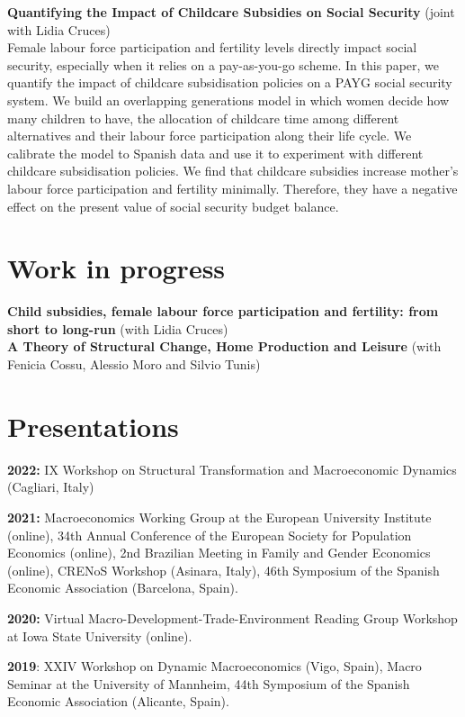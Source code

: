 \documentclass[margin]{res} %
\begin{document}
\begin{resume}
{\bf Quantifying the Impact of Childcare Subsidies on Social Security} (joint with Lidia Cruces) \\
Female labour force participation and fertility levels directly impact social security, especially when it relies on a pay-as-you-go scheme. In this paper, we quantify the impact of childcare subsidisation policies on a PAYG social security system. We build an overlapping generations model in which women decide how many children to have, the allocation of childcare time among different alternatives and their labour force participation along their life cycle. We calibrate the model to Spanish data and use it to experiment with different childcare subsidisation policies. We find that childcare subsidies increase mother's labour force participation and fertility minimally. Therefore, they have a negative effect on the present value of social security budget balance. 

\section{Work in progress}

{\bf Child subsidies, female labour force participation
and fertility: from short to long-run} (with Lidia Cruces)
\\
{\bf A Theory of Structural Change, Home Production and Leisure} (with Fenicia Cossu, Alessio Moro and Silvio Tunis)

\section{Presentations}

{\bf 2022:} IX Workshop on Structural Transformation and Macroeconomic Dynamics (Cagliari, Italy)

{\bf 2021:} Macroeconomics Working Group at the European University Institute (online), 34th Annual Conference of the European Society for Population Economics (online), 2nd Brazilian Meeting in Family and Gender Economics (online), CRENoS Workshop (Asinara, Italy), 46th Symposium of the Spanish Economic Association (Barcelona, Spain).

{\bf 2020:} Virtual Macro-Development-Trade-Environment Reading Group Workshop at Iowa State University (online).

{\bf 2019}: XXIV Workshop on Dynamic Macroeconomics (Vigo, Spain), Macro Seminar at the University of Mannheim, 44th Symposium of the Spanish Economic Association (Alicante, Spain).


\end{resume}
\end{document}
